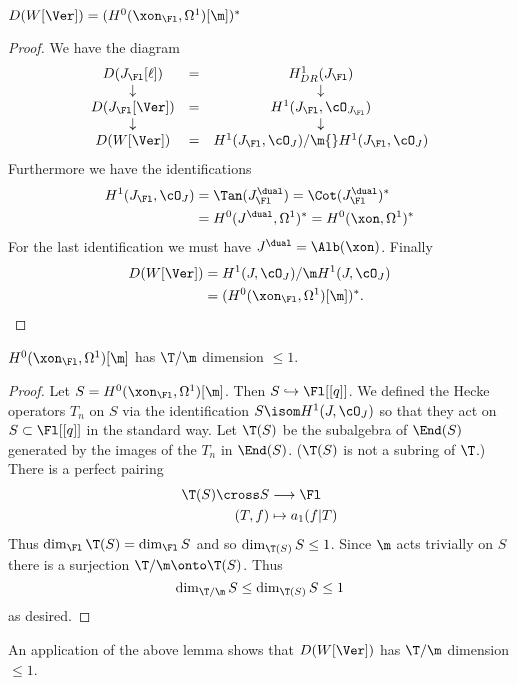 \documentclass{report}
\begin{document}
\begin{lemma} $D(W[\Ver])=(H^0(\xon_{\Fl},\Omega^1)[\m])^{*}$ \end{lemma}
\begin{proof}
We have the diagram
$$\begin{array}{ccc}
D(J_{\Fl}[\ell])&=&H^1_{DR}(J_{\Fl})\\
\downarrow&&\downarrow\\
D(J_{\Fl}[\Ver])&=&H^1(J_{\Fl},\cO_{J_{\Fl}})\\
\downarrow&&\downarrow\\
D(W[\Ver])&=&H^1(J_{\Fl},\cO_J)/\m{}H^1(J_{\Fl},\cO_J)
\end{array}$$
Furthermore we have the identifications
\begin{align*}
H^1(J_{\Fl},\cO_J)&=\Tan(J_{\Fl}^{\dual})=\Cot(J_{\Fl}^{\dual})^{*}\\
                  &=H^0(J^{\dual},\Omega^1)^*=H^0(\xon,\Omega^1)^{*}
\end{align*}
For the last identification we must have $J^{\dual}=\Alb(\xon)$.
Finally
\begin{align*}
D(W[\Ver])&=H^1(J,\cO_J)/\m H^1(J,\cO_J)\\
          &=(H^0(\xon_{\Fl},\Omega^1)[\m])^*.
\end{align*}
\end{proof}

\begin{lemma}
$H^0(\xon_{\Fl},\Omega^1)[\m]$ has $\T/\m$ dimension $\leq 1$.
\end{lemma}
\begin{proof}
Let $S=H^0(\xon_{\Fl},\Omega^1)[\m]$. Then $S\hookrightarrow \Fl[[q]]$.
We defined the Hecke operators $T_n$ on $S$ via the identification
$S\isom H^1(J,\cO_J)$ so that they act on $S\subset\Fl[[q]]$ in
the standard way.
Let $\T(S)$ be the subalgebra of $\End(S)$ generated by the images
of the $T_n$ in $\End(S)$. ($\T(S)$ is not a subring of $\T$.) There
is a perfect pairing
\begin{align*}\T(S)\cross S&\longrightarrow\Fl\\
(T,f)&\mapsto a_1(f|T)\end{align*}
Thus $\dim_{\Fl}\T(S)=\dim_{\Fl} S$ and so
$\dim_{\T(S)}S\leq 1$. Since $\m$ acts trivially on $S$ there is a
surjection $\T/\m\onto\T(S)$. Thus
$$\dim_{\T/\m}S\leq \dim_{\T(S)}S\leq 1$$
as desired.
\end{proof}

An application of the above lemma shows that $D(W[\Ver])$
has $\T/\m$ dimension $\leq 1$.
\end{document}
